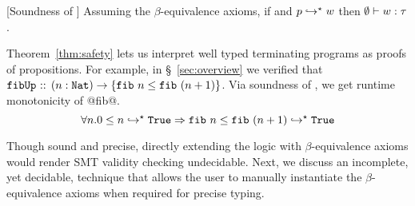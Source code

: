 \begin{theorem}{[Soundness of \corelan]}\label{thm:safety}
Assuming the $\beta$-equivalence axioms,
if \hastype{\emptyset}{\prog}{\typ}
       and ${p}\hookrightarrow^{\star}{w}$ then $\emptyset \vdash w : \tau$.
\end{theorem}

Theorem~\ref{thm:safety} lets us interpret well typed terminating programs as proofs of
propositions.
%
For example, in \S~\ref{sec:overview} we verified that
%
$\texttt{fibUp}\text{ :: }{\ensuremath{{(n:\mathtt{Nat})} \rightarrow {\{\ensuremath{\texttt{fib}\ {n}} \leq \ensuremath{\texttt{fib}\ {(n+1)}}\}}}}$.
%
Via soundness of \corelan, we get runtime monotonicity of @fib@.
$$
\forall n. {0 \leq n}\hookrightarrow^{\star}{\mathtt{True}} \Rightarrow {\ensuremath{\texttt{fib}\ {n}} \leq \ensuremath{\texttt{fib}\ {(n+1)}}}\hookrightarrow^{\star}{\mathtt{True}}
$$

%
Though sound and precise, directly extending the logic with $\beta$-equivalence axioms
would render SMT validity checking undecidable.
%
Next, we discuss an incomplete,
yet decidable, technique that allows the
user to manually instantiate the $\beta$-equivalence axioms
when required for precise typing.
